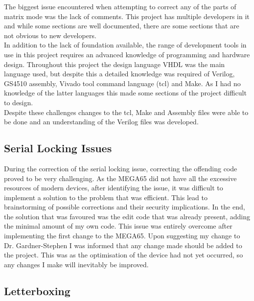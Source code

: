 The biggest issue encountered when attempting to correct any of the parts of matrix mode was the lack of comments. This project has multiple developers in it and while some sections are well documented, there are some sections that are not obvious to new developers.\\
In addition to the lack of foundation available, the range of development tools in use in this project requires an advanced knowledge of programming and hardware design. Throughout this project the design language VHDL was the main language used, but despite this a detailed knowledge was required of Verilog, GS4510 assembly, Vivado tool command language (tcl) and Make. As I had no knowledge of the latter languages this made some sections of the project difficult to design.\\
Despite these challenges changes to the tcl, Make and Assembly files were able to be done and an understanding of the Verilog files was developed.

\subsection{Serial Locking Issues}

\label{Ch7 Sec1 Sub2}

During the correction of the serial locking issue, correcting the offending code proved to be very challenging. As the MEGA65 did not have all the excessive resources of modern devices, after identifying the issue, it was difficult to implement a solution to the problem that was efficient. This lead to brainstorming of possible corrections and their security implications. In the end, the solution that was favoured was the edit code that was already present, adding the minimal amount of my own code. This issue was entirely overcome after implementing the first change to the MEGA65. Upon suggesting my change to Dr. Gardner-Stephen I was informed that any change made should be added to the project. This was as the optimisation of the device had not yet occurred, so any changes I make will inevitably be improved.  

\subsection{Letterboxing}

\label{Ch7 Sec1 Sub3}

